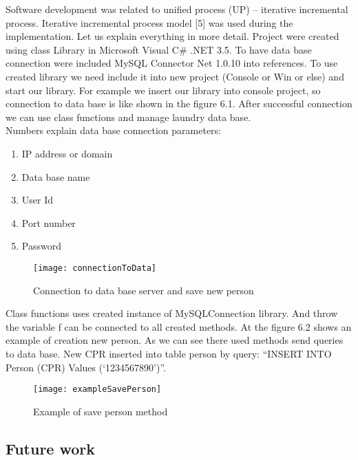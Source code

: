Software development was related to unified process (UP) – iterative incremental process.  Iterative incremental process model [5] was used during the implementation.  
Let us explain everything in more detail. Project were created using class Library in Microsoft Visual C\# .NET 3.5. To have data base connection were included MySQL Connector Net 1.0.10 into references. To use created library we need include it into new project (Console or Win or else) and start our library. For example we insert our library into console project, so connection to data base is like shown in the figure 6.1. After successful connection we can use class functions and manage laundry data base. \\ Numbers explain data base connection parameters: 

\begin{enumerate}
	\item IP address or domain
	\item Data base name
	\item User Id
	\item Port number
	\item Password
\end{enumerate}

\begin{figure}[h]
	\centering
		\texttt{[image: connectionToData]}
	\caption{Connection to data base server and save new person}
	\label{fig:planning}
\end{figure}

Class functions uses created instance of MySQLConnection library. And throw the variable f can be connected to all created methods. At the figure 6.2 shows an example of creation new person. As we can see there used methods send queries to data base. New CPR inserted into table person by query: “INSERT INTO Person (CPR) Values (‘1234567890’)”.


\begin{figure}[h]
	\centering
		\texttt{[image: exampleSavePerson]}
	\caption{Example of save person method}
	\label{fig:planning}
\end{figure}

\subsection{Future work}